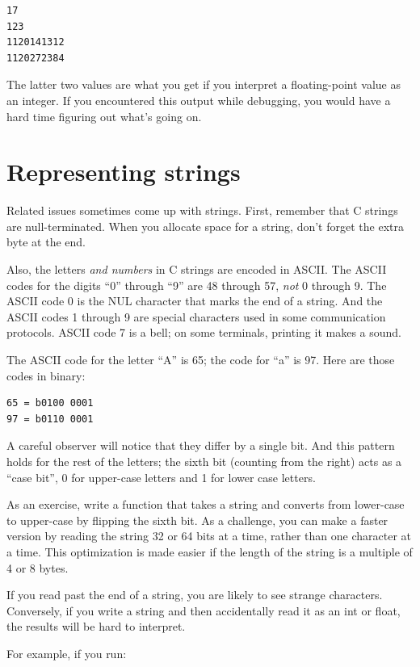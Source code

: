\documentclass[12pt]{book}
\begin{document}
{\begin{verbatim}
17
123
1120141312
1120272384
\end{verbatim}

The latter two values are what you get if you interpret a
floating-point value as an integer.  If you encountered this output
while debugging, you would have a hard time figuring out what's
going on.


\section{Representing strings}

Related issues sometimes come up with strings.  First, remember
that C strings are null-terminated.  When you allocate space
for a string, don't forget the extra byte at the end.

Also, the letters {\it and numbers} in C strings are
encoded in ASCII.  The ASCII codes for the digits ``0'' through ``9''
are 48 through 57, {\it not} 0 through 9.  The ASCII code 0 is the NUL
character that marks the end of a string.  And the ASCII codes 1
through 9 are special characters used in some communication protocols.
ASCII code 7 is a bell; on some terminals, printing it makes a sound.

The ASCII code for the letter ``A'' is 65; the code for
``a'' is 97.  Here are those codes in binary:

\begin{verbatim}
65 = b0100 0001
97 = b0110 0001
\end{verbatim}

A careful observer will notice that they differ by a single
bit.  And this pattern holds for the rest of the letters; the
sixth bit (counting from the right) acts as a ``case bit'', 0 for
upper-case letters and 1 for lower case letters.

As an exercise, write a function that takes a string and converts
from lower-case to upper-case by flipping the sixth bit.  As a challenge,
you can make a faster version by reading the string 32 or 64 bits
at a time, rather than one character at a time.  This optimization
is made easier if the length of the string is a multiple of 4 or
8 bytes.

If you read past the end of a string, you are likely to see
strange characters.  Conversely, if you write a string and
then accidentally read it as an int or float, the results
will be hard to interpret.

For example, if you run:

}
\end{document}
